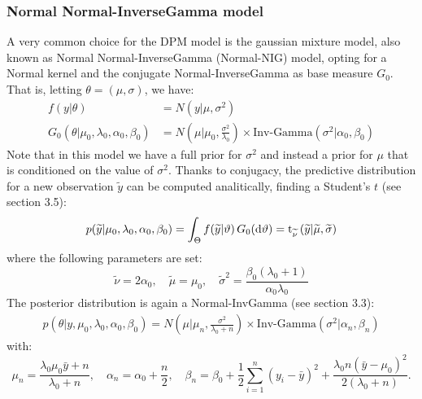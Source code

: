\subsubsection{Normal Normal-InverseGamma model} \label{nnig}
A very common choice for the DPM model is the gaussian mixture model, also known as Normal Normal-InverseGamma (Normal-NIG) model, opting for a Normal kernel and the conjugate Normal-InverseGamma as base measure $G_0$. That is, letting $\theta=(\mu,\sigma)$, we have:
\begin{equation}
	\begin{aligned}
		f(y|\theta)&=N(y| \mu ,\sigma^2)  \\
		G_0(\theta|\mu_0,\lambda_0, \alpha_0, 	\beta_0)
		&=N\left(\mu | \mu_0 ,\frac{\sigma^2} {\lambda_0}\right) \times \text{Inv-Gamma}(\sigma^2|\alpha_0, \beta_0 )
	\end{aligned}
\end{equation}
Note that in this model we have a full prior for $\sigma^2$ and instead a prior for $\mu$ that is conditioned on the value of $\sigma^2$.
Thanks to conjugacy, the predictive distribution for a new observation $\widetilde{y}$ can be computed analitically, finding a Student's $t$ (see \cite{integral} section 3.5):
\begin{align*}
	p(\widetilde{y}|\mu_0,\lambda_0, \alpha_0, \beta_0) =
	\int_\Theta f(\widetilde{y}|\vartheta) \, G_0(\mathrm d\vartheta) =
	\text{t}_{\widetilde \nu}\left(\widetilde{y}|\widetilde{\mu},\widetilde{\sigma}\right)
\end{align*}
where the following parameters are set:
$$
	\widetilde{\nu}=2 \alpha_0, \quad
	\widetilde{\mu}=\mu_0, \quad
	\widetilde{\sigma}^2= \frac{\beta_0(\lambda_0+1)}{\alpha_0 \lambda_0}
$$
The posterior distribution is again a Normal-InvGamma (see \cite{integral} section 3.3):
\begin{align*}
	p(\theta|y,\mu_0,\lambda_0, \alpha_0, \beta_0)=N\left(\mu | \mu_n ,\frac{\sigma^2} {\lambda_0 + n}\right) \times \text{Inv-Gamma}(\sigma^2|\alpha_n, \beta_n )
\end{align*}
with:
$$
\mu_n=\frac{\lambda_0 \mu_0 \bar{y} + n}{\lambda_0 + n}, \quad \alpha_n= \alpha_0 + \frac{n}{2}, \quad \beta_n= \beta_0 + \frac{1}{2}\sum_{i=1}^{n} (y_i-\bar{y})^2 + \frac{\lambda_0 n(\bar{y}-\mu_0)^2}{2(\lambda_0 + n)}.
$$
